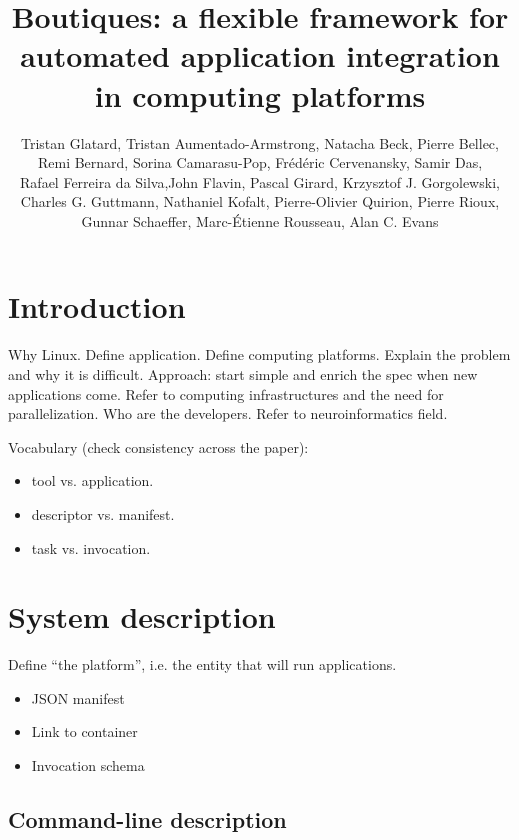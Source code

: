 \documentclass{article}
\title{Boutiques: a flexible framework for automated application integration in computing platforms}
\begin{document}
\author{Tristan Glatard, Tristan Aumentado-Armstrong, Natacha Beck, Pierre Bellec,\\
        Remi Bernard, Sorina Camarasu-Pop, Fr\'ed\'eric Cervenansky, Samir Das, \\
        Rafael Ferreira da Silva,John Flavin, Pascal Girard, Krzysztof J. Gorgolewski, \\
        Charles G. Guttmann, Nathaniel Kofalt, Pierre-Olivier Quirion, Pierre Rioux,\\
        Gunnar Schaeffer, Marc-\'Etienne Rousseau, Alan C. Evans}

\maketitle

\section{Introduction}

Why Linux. Define application. Define computing platforms. Explain the
problem and why it is difficult. Approach: start simple and enrich the
spec when new applications come. Refer to computing infrastructures
and the need for parallelization. Who are
the developers. Refer to neuroinformatics field. 

Vocabulary (check consistency across the paper):
\begin{itemize}
\item tool vs. application.
\item descriptor vs. manifest.
\item task vs. invocation.
\end{itemize}

\section{System description}

Define ``the platform'', i.e. the entity that will run applications.
\begin{itemize}
\item JSON manifest
\item Link to container
\item Invocation schema
\end{itemize}

\subsection{Command-line description}
\end{document}
